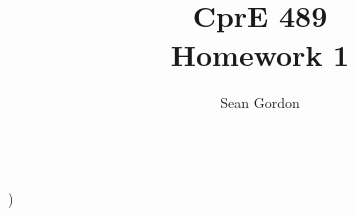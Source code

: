 \documentclass[12pt]{article}
\title{CprE 489\\Homework 1}
\author{Sean Gordon}
\begin{document}
\maketitle


\hrulefill \\


)
\end{document}
